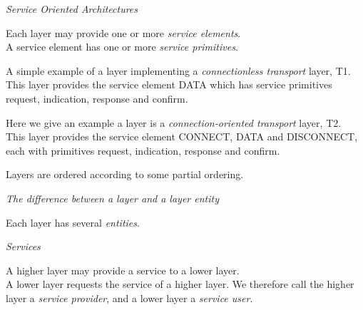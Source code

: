 \textit{Service Oriented Architectures}

Each layer may provide one or more \textit{service elements}.\\
A service element has one or more \textit{service primitives}.



\frmrule 



\begin{example}
A simple example of a layer implementing a \textit{connectionless transport} layer, \textsf{T1}. \\
This layer provides the service element \textsf{DATA} which has 
service primitives \textsf{request}, \textsf{indication},
\textsf{response} and \textsf{confirm}.
\end{example}

\frmrule 

\begin{example}
Here we give an example a layer is a \textit{connection-oriented transport} layer, \textsf{T2}. \\
This layer provides the service element \textsf{CONNECT}, \textsf{DATA} and \textsf{DISCONNECT}, each 
with primitives \textsf{request}, \textsf{indication},
\textsf{response} and \textsf{confirm}.
\end{example}

\frmrule 

Layers are ordered according to some partial ordering. \\

\frmrule 

\textit{The difference between a layer and a layer entity}

Each layer has several \textit{entities}. 



\frmrule 

\textit{Services}

A higher layer may provide a service to a lower layer. \\
A lower layer requests the service of a higher layer. 
We therefore call the higher layer a \textit{service provider}, 
and a lower layer a \textit{service user}. 

